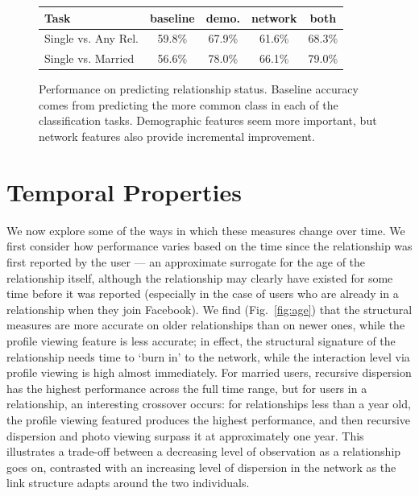 \documentclass{sigchi}
\def\rs{\vspace*{-0.10in}}
\begin{document}
\begin{figure}
\begin{center}
\begin{tabular}{|l|c|c|c|c|}
\hline
Task & baseline & demo. & network & both
\\\hline
Single vs. Any Rel. & 59.8\% & 67.9\% & 61.6\% & 68.3\%  \\ \hline 
Single vs. Married & 56.6\% & 78.0\% & 66.1\% & 79.0\%  \\ \hline 
\end{tabular}
\caption{
\label{table:predict_relationship}
Performance on predicting relationship status.
Baseline accuracy comes from predicting the more common class in each of
the classification tasks.  Demographic features seem more important,
but network features also provide incremental improvement.
\rs \rs 
}
\end{center}
\end{figure}







\section{Temporal Properties}

We now explore some of the ways in which these measures change over
time.
We first consider how performance varies
based on the time since the relationship was first reported
by the user --- 
an approximate surrogate for the age of the relationship itself,
although the relationship may clearly have existed for some
time before it was reported (especially in the case of users
who are already in a relationship when they join Facebook).
We find (Fig.~\ref{fig:age}) that the structural measures are more
accurate on older relationships than on newer ones, 
while the profile viewing feature is
less accurate; in effect, the structural signature of the relationship
needs time to `burn in' to the network, while the interaction 
level via profile viewing is high almost immediately.
For married users, recursive dispersion has the highest
performance across the full time range, but for users 
in a relationship, an interesting crossover occurs: for relationships
less than a year old, the profile viewing featured produces the
highest performance, and then recursive dispersion and photo viewing
surpass it at approximately one year.
This illustrates a trade-off between a decreasing level of 
observation as a relationship goes on, contrasted with an 
increasing level of dispersion in the network 
as the link structure adapts around the two individuals.
\end{document}
